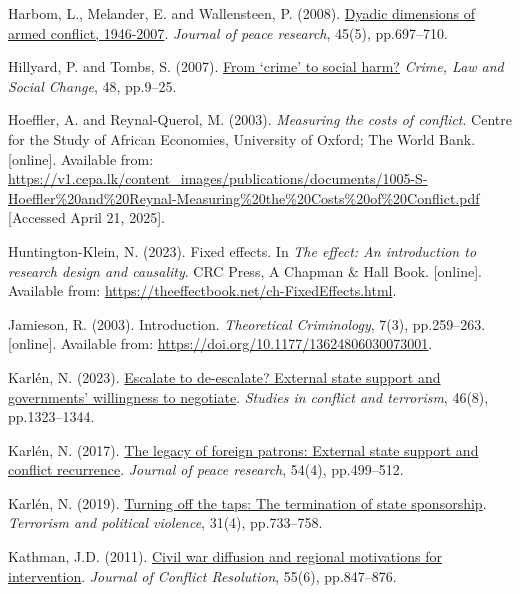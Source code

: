 \documentclass[
]{article}
\newlength{\cslhangindent}
\newenvironment{CSLReferences}[2] %
 {\begin{list}{}{%
  \setlength{\itemindent}{0pt}
  \setlength{\leftmargin}{0pt}
  \setlength{\parsep}{0pt}
  \ifodd #1
   \setlength{\leftmargin}{\cslhangindent}
   \setlength{\itemindent}{-1\cslhangindent}
  \fi
  \setlength{\itemsep}{#2\baselineskip}}}
 {\end{list}}
\begin{document}
\begin{CSLReferences}{0}{1}
Harbom, L., Melander, E. and Wallensteen, P. (2008).
\href{https://doi.org/10.1177/0022343308094331}{Dyadic dimensions of
armed conflict, 1946-2007}. \emph{Journal of peace research}, 45(5),
pp.697--710.

Hillyard, P. and Tombs, S. (2007).
\href{https://doi.org/10.1007/s10611-007-9079-z}{From {`crime'} to
social harm?} \emph{Crime, Law and Social Change}, 48, pp.9--25.

Hoeffler, A. and Reynal-Querol, M. (2003). \emph{Measuring the costs of
conflict}. Centre for the Study of African Economies, University of
Oxford; The World Bank. {[}online{]}. Available from:
\url{https://v1.cepa.lk/content_images/publications/documents/1005-S-Hoeffler\%20and\%20Reynal-Measuring\%20the\%20Costs\%20of\%20Conflict.pdf}
{[}Accessed April 21, 2025{]}.

Huntington-Klein, N. (2023). Fixed effects. In \emph{The effect: An
introduction to research design and causality}. CRC Press, A Chapman \&
Hall Book. {[}online{]}. Available from:
\url{https://theeffectbook.net/ch-FixedEffects.html}.

Jamieson, R. (2003). Introduction. \emph{Theoretical Criminology}, 7(3),
pp.259--263. {[}online{]}. Available from:
\url{https://doi.org/10.1177/13624806030073001}.

Karlén, N. (2023).
\href{https://doi.org/10.1080/1057610X.2020.1835002}{Escalate to
de-escalate? External state support and governments' willingness to
negotiate}. \emph{Studies in conflict and terrorism}, 46(8),
pp.1323--1344.

Karlén, N. (2017). \href{https://doi.org/10.1177/0022343317700465}{The
legacy of foreign patrons: External state support and conflict
recurrence}. \emph{Journal of peace research}, 54(4), pp.499--512.

Karlén, N. (2019).
\href{https://doi.org/10.1080/09546553.2017.1282861}{Turning off the
taps: The termination of state sponsorship}. \emph{Terrorism and
political violence}, 31(4), pp.733--758.

Kathman, J.D. (2011).
\href{https://doi.org/10.1177/0022002711408009}{Civil war diffusion and
regional motivations for intervention}. \emph{Journal of Conflict
Resolution}, 55(6), pp.847--876.


\end{CSLReferences}
\end{document}
